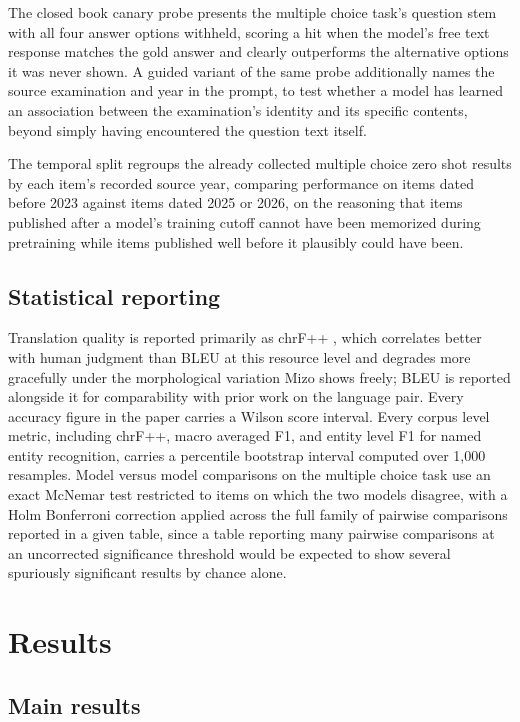 \documentclass[11pt,a4paper]{article}
\begin{document}
The closed book canary probe presents the multiple choice task's question stem with all four answer options withheld, scoring a hit when the model's free text response matches the gold answer and clearly outperforms the alternative options it was never shown. A guided variant of the same probe additionally names the source examination and year in the prompt, to test whether a model has learned an association between the examination's identity and its specific contents, beyond simply having encountered the question text itself.

The temporal split regroups the already collected multiple choice zero shot results by each item's recorded source year, comparing performance on items dated before 2023 against items dated 2025 or 2026, on the reasoning that items published after a model's training cutoff cannot have been memorized during pretraining while items published well before it plausibly could have been.

\subsection{Statistical reporting}

Translation quality is reported primarily as chrF++ \citep{popovic2015chrf,popovic2017chrfpp}, which correlates better with human judgment than BLEU at this resource level and degrades more gracefully under the morphological variation Mizo shows freely; BLEU is reported alongside it for comparability with prior work on the language pair. Every accuracy figure in the paper carries a Wilson score interval. Every corpus level metric, including chrF++, macro averaged F1, and entity level F1 for named entity recognition, carries a percentile bootstrap interval computed over 1,000 resamples. Model versus model comparisons on the multiple choice task use an exact McNemar test restricted to items on which the two models disagree, with a Holm Bonferroni correction applied across the full family of pairwise comparisons reported in a given table, since a table reporting many pairwise comparisons at an uncorrected significance threshold would be expected to show several spuriously significant results by chance alone.

\section{Results}
\label{sec:results}

\subsection{Main results}
\end{document}
